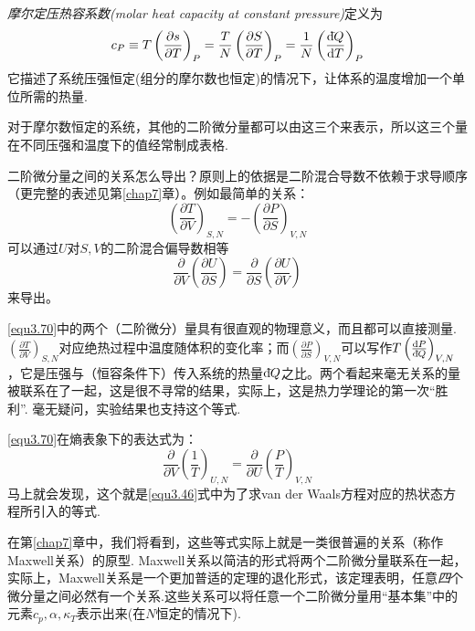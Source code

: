 {\it 摩尔定压热容系数(molar heat capacity at constant pressure)}定义为
\begin{equation}
\label{equ3.69}
c_P \equiv T\left(\frac{\partial s}{\partial T}\right)_P=\frac{T}{N}\left(\frac{\partial S}{\partial T}\right)_P=\frac{1}{N}\left(\frac{\mathrm d\hspace*{-0.1em}\bar{}\hspace*{0.08em} Q}{\text{d}T}\right)_P
\end{equation}
它描述了系统压强恒定(组分的摩尔数也恒定)的情况下，让体系的温度增加一个单位所需的热量.

对于摩尔数恒定的系统，其他的二阶微分量都可以由这三个来表示，所以这三个量在不同压强和温度下的值经常制成表格.

二阶微分量之间的关系怎么导出？原则上的依据是二阶混合导数不依赖于求导顺序（更完整的表述见第\ref{chap7}章）。例如最简单的关系：
\begin{equation}
\label{equ3.70}
\left(\frac{\partial T}{\partial V}\right)_{S,N}=-\left(\frac{\partial P}{\partial S}\right)_{V,N}
\end{equation}
可以通过$U$对$S,V$的二阶混合偏导数相等
\begin{equation}
\label{3.71}
\frac{\partial}{\partial V}\left(\frac{\partial U}{\partial S}\right)=\frac{\partial}{\partial S}\left(\frac{\partial U}{\partial V}\right)
\end{equation}
来导出。

\eqref{equ3.70}中的两个（二阶微分）量具有很直观的物理意义，而且都可以直接测量. $\left(\frac{\partial T}{\partial V}\right)_{S, N}$对应绝热过程中温度随体积的变化率；而$\left(\frac{\partial P}{\partial S}\right)_{V,N}$可以写作$T\left(\frac{\text{d} P}{\mathrm d\hspace*{-0.1em}\bar{}\hspace*{0.08em} Q}\right)_{V,N}$，它是压强与（恒容条件下）传入系统的热量$\mathrm d\hspace*{-0.1em}\bar{}\hspace*{0.08em} Q$之比。两个看起来毫无关系的量被联系在了一起，这是很不寻常的结果，实际上，这是热力学理论的第一次“胜利”. 毫无疑问，实验结果也支持这个等式.

\eqref{equ3.70}在熵表象下的表达式为：
\begin{equation}
\label{equ3.72}
\frac{\partial }{\partial V}\left(\frac{1}{T}\right)_{U,N}=\frac{\partial }{\partial U}\left(\frac{P}{T}\right)_{V,N}
\end{equation}
马上就会发现，这个就是\eqref{equ3.46}式中为了求van der Waals方程对应的热状态方程所引入的等式.

在第\ref{chap7}章中，我们将看到，这些等式实际上就是一类很普遍的关系（称作Maxwell关系）的原型. Maxwell关系以简洁的形式将两个二阶微分量联系在一起，实际上，Maxwell关系是一个更加普适的定理的退化形式，该定理表明，任意{\it 四}个微分量之间必然有一个关系.这些关系可以将任意一个二阶微分量用“基本集”中的元素$c_p,\alpha,\kappa_T$表示出来(在$N$恒定的情况下).

